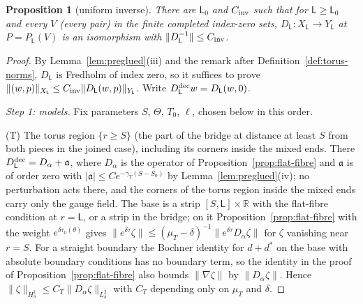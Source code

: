 \documentclass[11pt]{amsart}
\newtheorem{proposition}[theorem]{Proposition}
\theoremstyle{definition}
\theoremstyle{remark}
\theoremstyle{plain}
\numberwithin{equation}{section}
\newcommand{\RR}{\mathbb{R}}
\begin{document}
\begin{proposition}[uniform inverse]\label{prop:torus-inverse}
There are $\mathsf L_0$ and $C_{\rm inv}$ such that for $\mathsf L\ge \mathsf L_0$ and every $V$ (every pair) in the
finite completed index-zero sets, $D_\mathsf L\colon X_\mathsf L\to Y_\mathsf L$ at $P=P_{\mathsf L}(V)$ is an
isomorphism with $\|D_{\mathsf L}^{-1}\|\le C_{\rm inv}$.
\end{proposition}

\begin{proof}
By Lemma~\ref{lem:preglued}(iii) and the remark after
Definition~\ref{def:torus-norms}, $D_\mathsf L$ is Fredholm of index zero, so it suffices to
prove $\|(w,p)\|_{X_\mathsf L}\le C_{\rm inv}\|D_{\mathsf L}(w,p)\|_{Y_\mathsf L}$. Write $D^{\rm dec}_{\mathsf L}w=D_{\mathsf L}(w,0)$.

\emph{Step 1: models.} Fix parameters $S$, $\Theta$, $T_0$, $\ell$, chosen below in this
order.

(T) The torus region $\{r\ge S\}$ (the part of the bridge at distance at least $S$
from both pieces in the joined case), including its corners inside the mixed ends.
There $D^{\rm dec}_\mathsf L=D_\alpha+\mathfrak a$, where $D_\alpha$ is the operator of
Proposition~\ref{prop:flat-fibre} and $\mathfrak a$ is of order zero with
$|\mathfrak a|\le Ce^{-\gamma_T(S-S_0)}$ by Lemma~\ref{lem:preglued}(iv); no perturbation acts
there, and the corners of the torus region inside the mixed ends carry only the
gauge field. The base is a strip $[S,\mathsf L]\times\RR$ with the flat-fibre condition at $r=\mathsf L$,
or a strip in the bridge; on it Proposition~\ref{prop:flat-fibre} with the weight
$e^{\delta\tau_0(\theta)}$ gives $\|e^{\delta\tau}\zeta\|\le(\mu_T-\delta)^{-1}\|e^{\delta\tau}D_\alpha\zeta\|$ for $\zeta$
vanishing near $r=S$. For a straight boundary the Bochner identity for $d+d^*$ on
the base with absolute boundary conditions has no boundary term, so the identity
in the proof of Proposition~\ref{prop:flat-fibre} also bounds $\|\nabla\zeta\|$ by
$\|D_\alpha\zeta\|$. Hence $\|\zeta\|_{H^1_\delta}\le C_T\|D_\alpha\zeta\|_{L^2_\delta}$ with $C_T$ depending only on
$\mu_T$ and $\delta$.


\end{proof}
\end{document}
